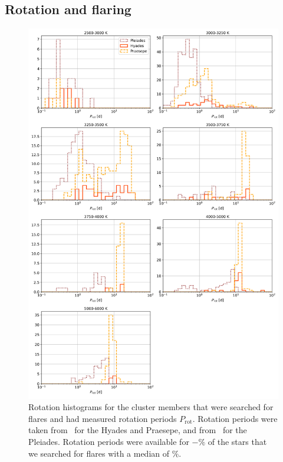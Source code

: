 \documentclass{aa}
\begin{document}
\begin{appendix}
\section{Rotation and flaring}

   \begin{figure}
   \centering
            \includegraphics[width=16cm]{pics/rotation/SpT_wise_rotation.png}
         \caption{Rotation histograms for the cluster members that were searched for flares and had measured rotation periods $P_\mathrm{rot}$. Rotation periods were taken from~\citet{douglas2019} for the Hyades and Praesepe, and from~\citet{rebull_pleiadesrot_2016} for the Pleiades. Rotation periods were available for $-\%$ of the stars that we searched for flares with a median of $\%$.}

\end{figure}
\end{appendix}
\end{document}
